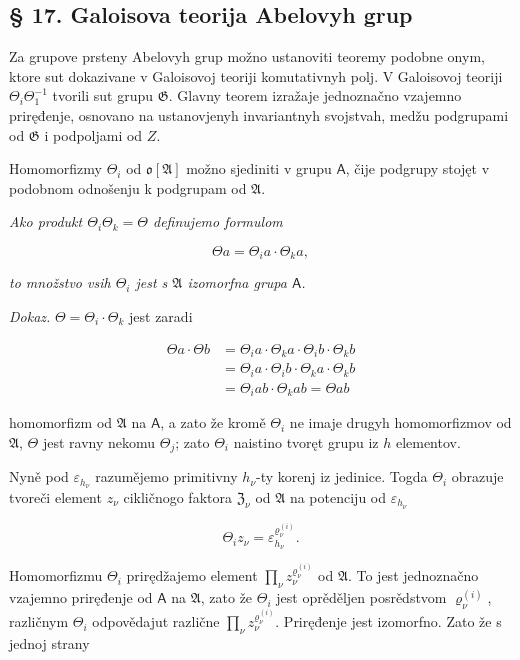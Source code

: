 \documentclass[11pt]{article}
\begin{document}
\subsection*{§ 17. Galoisova teorija Abelovyh grup}\label{die-galoissche-theorie-abelscher-gruppen}

Za grupove prsteny Abelovyh grup možno ustanoviti teoremy podobne onym, ktore sut dokazivane v Galoisovoj teoriji komutativnyh polj. V Galoisovoj teoriji \(\Theta_i\Theta_1^{-1}\) tvorili sut grupu \(\mathfrak{G}\). Glavny teorem izražaje jednoznačno vzajemno priręđenje, osnovano na ustanovjenyh invariantnyh svojstvah, medžu podgrupami od \(\mathfrak{G}\) i podpoljami od \(Z\).

Homomorfizmy \(\Theta_i\) od \(\mathfrak{o}[\mathfrak{A}]\) možno sjediniti v grupu \(\mathsf A\), čije podgrupy stojęt v podobnom odnošenju k podgrupam od \(\mathfrak{A}\).

\emph{Ako produkt \(\Theta_i \Theta_k = \Theta\) definujemo formulom}

\[\Theta a = \Theta_i a \cdot \Theta_k a,\]

\emph{to množstvo vsih \(\Theta_i\) jest s \(\mathfrak A\) izomorfna grupa \(\mathsf A\).}

\emph{Dokaz.} \(\Theta = \Theta_i \cdot \Theta_k\) jest zaradi

\[\begin{aligned}
\Theta a \cdot \Theta b &= \Theta_i a \cdot \Theta_k a \cdot \Theta_i b \cdot \Theta_k b \\
&= \Theta_i a \cdot \Theta_i b \cdot \Theta_k a \cdot \Theta_k b \\
&= \Theta_i a b \cdot \Theta_k a b = \Theta a b
\end{aligned}\]

homomorfizm od \(\mathfrak A\) na \(\mathsf A\), a zato že kromě \(\Theta_i\) ne imaje drugyh homomorfizmov od \(\mathfrak A\), \(\Theta\) jest ravny nekomu \(\Theta_j\); zato \(\Theta_i\) naistino tvoręt grupu iz \(h\) elementov.

Nyně pod \(\varepsilon_{h_\nu}\) razumějemo primitivny \(h_\nu\)-ty korenj iz jedinice. Togda \(\Theta_i\) obrazuje tvoreči element \(z_\nu\) cikličnogo faktora \(\mathfrak Z_\nu\) od \(\mathfrak A\) na potenciju od \(\varepsilon_{h_\nu}\)

\[
\Theta_i z_\nu=\varepsilon_{h_\nu}^{\varrho_\nu^{(i)}}.
\]

Homomorfizmu \(\Theta_i\) prirędžajemo element \(\prod_\nu z_\nu^{\varrho_\nu^{(i)}}\) od \(\mathfrak A\). To jest jednoznačno vzajemno priręđenje od \(\mathsf A\) na \(\mathfrak A\), zato že \(\Theta_i\) jest oprěděljen posrědstvom \(\varrho_\nu^{(i)}\), različnym \(\Theta_i\) odpovědajut različne \(\prod_\nu z_\nu^{\varrho_\nu^{(i)}}\). Priręđenje jest izomorfno. Zato že s jednoj strany
\end{document}

